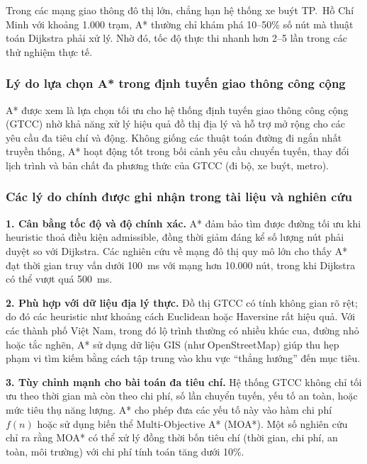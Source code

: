 Trong các mạng giao thông đô thị lớn, chẳng hạn hệ thống xe buýt TP.~Hồ Chí Minh với khoảng 1.000 trạm, A* thường chỉ khám phá 10--50\% số nút mà thuật toán Dijkstra phải xử lý. Nhờ đó, tốc độ thực thi nhanh hơn 2--5 lần trong các thử nghiệm thực tế.




\subsubsection{Lý do lựa chọn A* trong định tuyến giao thông công cộng}

A* được xem là lựa chọn tối ưu cho hệ thống định tuyến giao thông công cộng (GTCC) nhờ khả năng xử lý hiệu quả đồ thị địa lý và hỗ trợ mở rộng cho các yêu cầu đa tiêu chí và động. Không giống các thuật toán đường đi ngắn nhất truyền thống, A* hoạt động tốt trong bối cảnh yêu cầu chuyển tuyến, thay đổi lịch trình và bản chất đa phương thức của GTCC (đi bộ, xe buýt, metro).

\subsubsection{Các lý do chính được ghi nhận trong tài liệu và nghiên cứu}

\textbf{1. Cân bằng tốc độ và độ chính xác.}  
A* đảm bảo tìm được đường tối ưu khi heuristic thoả điều kiện admissible, đồng thời giảm đáng kể số lượng nút phải duyệt so với Dijkstra. Các nghiên cứu về mạng đô thị quy mô lớn cho thấy A* đạt thời gian truy vấn dưới 100~ms với mạng hơn 10.000 nút, trong khi Dijkstra có thể vượt quá 500~ms.

\textbf{2. Phù hợp với dữ liệu địa lý thực.}  
Đồ thị GTCC có tính không gian rõ rệt; do đó các heuristic như khoảng cách Euclidean hoặc Haversine rất hiệu quả. Với các thành phố Việt Nam, trong đó lộ trình thường có nhiều khúc cua, đường nhỏ hoặc tắc nghẽn, A* sử dụng dữ liệu GIS (như OpenStreetMap) giúp thu hẹp phạm vi tìm kiếm bằng cách tập trung vào khu vực ``thẳng hướng'' đến mục tiêu.

\textbf{3. Tùy chỉnh mạnh cho bài toán đa tiêu chí.}  
Hệ thống GTCC không chỉ tối ưu theo thời gian mà còn theo chi phí, số lần chuyển tuyến, yếu tố an toàn, hoặc mức tiêu thụ năng lượng. A* cho phép đưa các yếu tố này vào hàm chi phí $f(n)$ hoặc sử dụng biến thể Multi-Objective A* (MOA*). Một số nghiên cứu chỉ ra rằng MOA* có thể xử lý đồng thời bốn tiêu chí (thời gian, chi phí, an toàn, môi trường) với chi phí tính toán tăng dưới 10\%.

